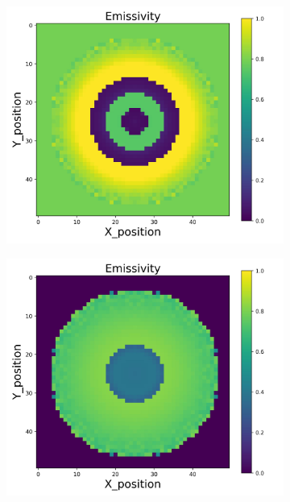 {\begin{figure}[p]
\begin{minipage}{\textwidth}
\begin{subfigure}{0.325\textwidth}
        \end{subfigure}
    \end{minipage}\\
    \begin{minipage}{\textwidth}
        \centering
        \begin{subfigure}{0.325\textwidth}
            \centering
            \includegraphics[width=\textwidth]{figures/raw_data/25/quad/emi_cal.jpg}
        \end{subfigure}
        \begin{subfigure}{0.325\textwidth}
            \centering
            \includegraphics[width=\textwidth]{figures/raw_data/26/quad/emi_cal.jpg}

\end{subfigure}
\end{minipage}
\end{figure}}
